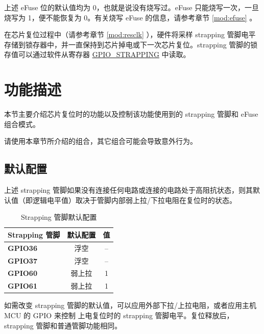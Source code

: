 \documentclass[main\_\_CN.tex]{subfiles}
\begin{document}
上述 eFuse 位的默认值均为 0，也就是说没有烧写过。eFuse 只能烧写一次，一旦烧写为 1，便不能恢复为 0。有关烧写 eFuse 的信息，请参考章节 \ref{mod:efuse} \textit{}。

在芯片复位过程中（请参考章节 \ref{mod:resclk} \textit{}），硬件将采样 strapping 管脚电平存储到锁存器中，并一直保持到芯片掉电或下一次芯片复位。strapping 管脚的锁存值可以通过软件从寄存器 \hyperref[fielddesc:GPIOSTRAPPING]{GPIO\_STRAPPING} 中读取。

\section{功能描述}
\label{sec:bootctrl-func-descr}

本节主要介绍芯片复位时的功能以及控制该功能使用到的 strapping 管脚和 eFuse 组合模式。

\begin{importantlisting}
请使用本章节所介绍的组合，其它组合可能会导致意外行为。
\end{importantlisting}

\subsection{默认配置}

上述 strapping 管脚如果没有连接任何电路或连接的电路处于高阻抗状态，则其默认值（即逻辑电平值）取决于管脚内部弱上拉/下拉电阻在复位时的状态。

\begin{table}[H]
    \centering
    \caption{Strapping 管脚默认配置}
    \label{tab:bootctrl-default-config-strapping-pins}
    \begin{tabular}{ | l | c | c | }
    \hline
        \rowcolor{lightgray}
        \textbf{Strapping 管脚} & \textbf{默认配置} & \textbf{值} \\\hline
        \textbf{GPIO36}  & 浮空 & -- \\\hline
        \textbf{GPIO37}  & 浮空 & -- \\\hline
        \textbf{GPIO60}  & 弱上拉 & 1 \\\hline
        \textbf{GPIO61}  & 弱上拉 & 1 \\\hline
    \end{tabular}
\end{table}

如需改变 strapping 管脚的默认值，可以应用外部下拉/上拉电阻，或者应用主机 MCU 的 GPIO 来控制 \chipname{} 上电复位时的 strapping 管脚电平。复位释放后，strapping 管脚和普通管脚功能相同。
\end{document}

